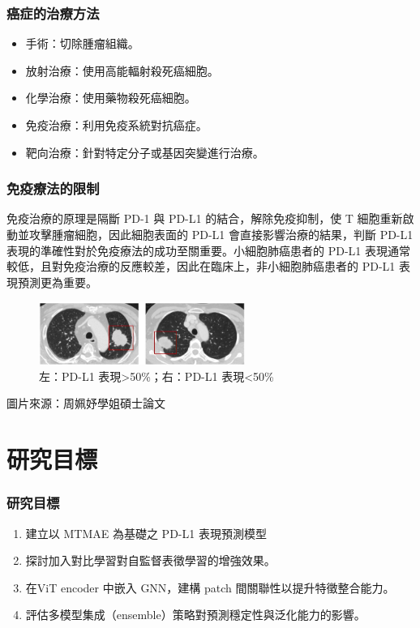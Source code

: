 \documentclass[xcolor=dvipsnames]{beamer}
\begin{document}
    \begin{frame}
        \frametitle{癌症的治療方法}
        \begin{itemize}
            \item 手術：切除腫瘤組織。
            \item 放射治療：使用高能輻射殺死癌細胞。
            \item 化學治療：使用藥物殺死癌細胞。
            \item 免疫治療：利用免疫系統對抗癌症。
            \item 靶向治療：針對特定分子或基因突變進行治療。
        \end{itemize}
    \end{frame}

    \begin{frame}
        \frametitle{免疫療法的限制}
        免疫治療的原理是隔斷 PD-1 與 PD-L1 的結合，解除免疫抑制，使 T 細胞重新啟動並攻擊腫瘤細胞，因此細胞表面的 PD-L1 會直接影響治療的結果，判斷 PD-L1 表現的準確性對於免疫療法的成功至關重要。小細胞肺癌患者的 PD-L1 表現通常較低，且對免疫治療的反應較差，因此在臨床上，非小細胞肺癌患者的 PD-L1 表現預測更為重要。
        \begin{figure}
            \centering
            \includegraphics[width=0.6\textwidth]{src/image1.png}
            \caption{左：PD-L1 表現>50\%；右：PD-L1 表現<50\%}
            \label{fig:pd-l1expression}
        \end{figure}
        圖片來源：周姵妤學姐碩士論文
    \end{frame}

    \section{研究目標}
    \begin{frame}
        \sectionpage
    \end{frame}

    \begin{frame}
        \frametitle{研究目標}
        \begin{enumerate}
        \item 建立以 MTMAE 為基礎之 PD-L1 表現預測模型
        \item 探討加入對比學習對自監督表徵學習的增強效果。
        \item 在ViT encoder 中嵌入 GNN，建構 patch 間關聯性以提升特徵整合能力。
        \item 評估多模型集成（ensemble）策略對預測穩定性與泛化能力的影響。
        \end{enumerate}
    \end{frame}
\end{document}
